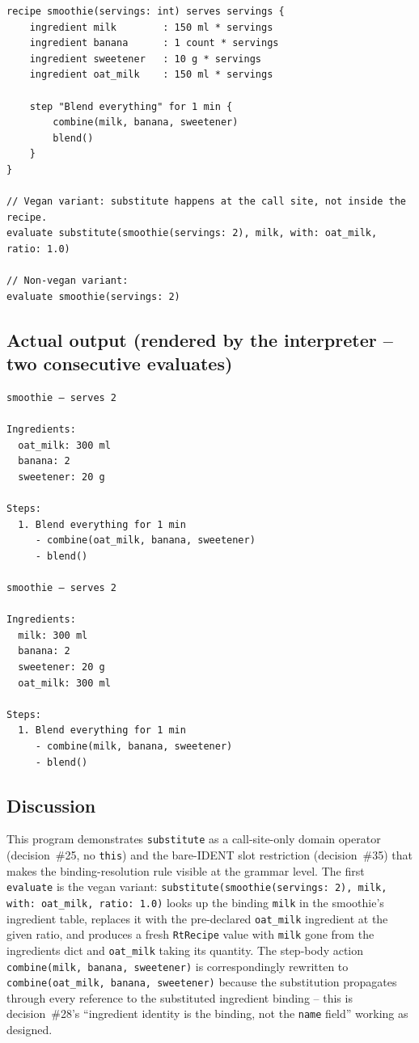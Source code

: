 \documentclass[11pt,a4paper]{article}
\begin{document}
\begin{lstlisting}
recipe smoothie(servings: int) serves servings {
    ingredient milk        : 150 ml * servings
    ingredient banana      : 1 count * servings
    ingredient sweetener   : 10 g * servings
    ingredient oat_milk    : 150 ml * servings

    step "Blend everything" for 1 min {
        combine(milk, banana, sweetener)
        blend()
    }
}

// Vegan variant: substitute happens at the call site, not inside the recipe.
evaluate substitute(smoothie(servings: 2), milk, with: oat_milk, ratio: 1.0)

// Non-vegan variant:
evaluate smoothie(servings: 2)
\end{lstlisting}

\subsection*{Actual output (rendered by the interpreter -- two consecutive evaluates)}

\begin{lstlisting}[style=output]
smoothie — serves 2

Ingredients:
  oat_milk: 300 ml
  banana: 2
  sweetener: 20 g

Steps:
  1. Blend everything for 1 min
     - combine(oat_milk, banana, sweetener)
     - blend()

smoothie — serves 2

Ingredients:
  milk: 300 ml
  banana: 2
  sweetener: 20 g
  oat_milk: 300 ml

Steps:
  1. Blend everything for 1 min
     - combine(milk, banana, sweetener)
     - blend()
\end{lstlisting}

\subsection*{Discussion}

This program demonstrates \texttt{substitute} as a call-site-only
domain operator (decision~\#25, no \texttt{this}) and the bare-IDENT
slot restriction (decision~\#35) that makes the binding-resolution
rule visible at the grammar level. The first \texttt{evaluate} is the
vegan variant: \texttt{substitute(smoothie(servings:~2), milk, with:
oat\_milk, ratio:~1.0)} looks up the binding \texttt{milk} in the
smoothie's ingredient table, replaces it with the pre-declared
\texttt{oat\_milk} ingredient at the given ratio, and produces a
fresh \texttt{RtRecipe} value with \texttt{milk} gone from the
ingredients dict and \texttt{oat\_milk} taking its quantity. The
step-body action \texttt{combine(milk, banana, sweetener)} is
correspondingly rewritten to \texttt{combine(oat\_milk, banana,
sweetener)} because the substitution propagates through every
reference to the substituted ingredient binding -- this is
decision~\#28's ``ingredient identity is the binding, not the
\texttt{name} field'' working as designed.
\end{document}
